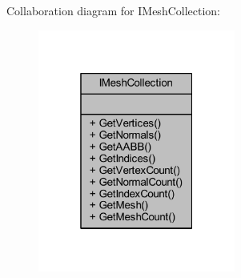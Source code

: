 Collaboration diagram for I\+Mesh\+Collection\+:\nopagebreak
\begin{figure}[H]
\begin{center}
\leavevmode
\includegraphics[width=184pt]{class_i_mesh_collection__coll__graph}
\end{center}
\end{figure}

